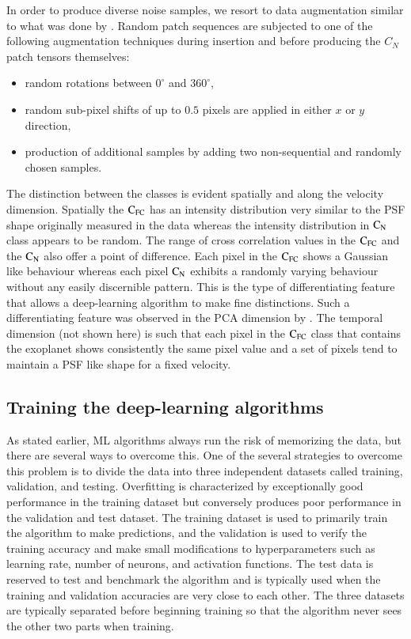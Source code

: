 \documentclass{aa}
\begin{document}
In order to produce diverse noise samples, we resort to data augmentation similar to what was done by \cite{2018Gomez}.
Random patch sequences are subjected to one of the following augmentation techniques during insertion and before producing the $C_{N}$ patch tensors themselves:
\begin{itemize}
    \item random rotations between $0^{\circ}$ and $360^{\circ}$,
    \item random sub-pixel shifts of up to $0.5$ pixels are applied in either $x$ or $y$ direction,
    \item production of additional samples by adding two non-sequential and randomly chosen samples.
\end{itemize}
The distinction between the classes is evident spatially and along the velocity dimension.
Spatially the $\rm{C_{FC}}$ has an intensity distribution very similar to the PSF shape originally measured in the data whereas the intensity distribution in $\rm{C_N}$ class appears to be random.
The range of cross correlation values in the $\rm{C_{FC}}$ and the $\rm{C_N}$ also offer a point of difference.
Each pixel in the $\rm{C_{FC}}$ shows a Gaussian like behaviour whereas each pixel $\rm{C_{N}}$ exhibits a randomly varying behaviour without any easily discernible pattern.
This is the type of differentiating feature that allows a deep-learning algorithm to make fine distinctions.
Such a differentiating feature was observed in the PCA dimension by \cite{2018Gomez}.
The temporal dimension (not shown here) is such that each pixel in the $\rm{C_{FC}}$ class that contains the exoplanet shows consistently the same pixel value and a set of pixels tend to maintain a PSF like shape for a fixed velocity. 


\subsection{Training the deep-learning algorithms}

As stated earlier, ML algorithms always run the risk of memorizing the data, but there are several ways to overcome this.
One of the several strategies to overcome this problem is to divide the data into three independent datasets called training, validation, and testing.
Overfitting is characterized by exceptionally good performance in the training dataset but conversely produces poor performance in the validation and test dataset.
The training dataset is used to primarily train the algorithm to make predictions, and the validation is used to verify the training accuracy and make small modifications to hyperparameters such as learning rate, number of neurons, and activation functions. %
The test data is reserved to test and benchmark the algorithm and is typically used when the training and validation accuracies are very close to each other.
The three datasets are typically separated before beginning training so that the algorithm never sees the other two parts when training.
\end{document}
